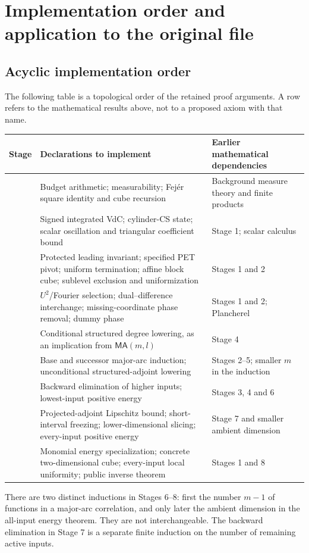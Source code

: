 \documentclass[11pt]{article}
\theoremstyle{definition}
\begin{document}
\section{Implementation order and application to the original file}
\label{patch:implementation}
\subsection{Acyclic implementation order}
The following table is a topological order of the retained proof arguments.  A row refers to
the mathematical results above, not to a proposed axiom with that name.
\begin{center}\small
\begin{tabular}{>{\raggedright\arraybackslash}p{.06\linewidth}>{\raggedright\arraybackslash}p{.47\linewidth}>{\raggedright\arraybackslash}p{.35\linewidth}}
\hline
Stage & Declarations to implement & Earlier mathematical dependencies \\\hline
1 & Budget arithmetic; measurability; Fej\'er square identity and cube recursion & Background measure theory and finite products \\
2 & Signed integrated VdC; cylinder-CS state; scalar oscillation and triangular coefficient bound & Stage 1; scalar calculus \\
3 & Protected leading invariant; specified PET pivot; uniform termination; affine block cube; sublevel exclusion and uniformization & Stages 1 and 2 \\
4 & $U^2$/Fourier selection; dual--difference interchange; missing-coordinate phase removal; dummy phase & Stages 1 and 2; Plancherel \\
5 & Conditional structured degree lowering, as an implication from $\mathsf{MA}(m,l)$ & Stage 4 \\
6 & Base and successor major-arc induction; unconditional structured-adjoint lowering & Stages 2--5; smaller $m$ in the induction \\
7 & Backward elimination of higher inputs; lowest-input positive energy & Stages 3, 4 and 6 \\
8 & Projected-adjoint Lipschitz bound; short-interval freezing; lower-dimensional slicing; every-input positive energy & Stage 7 and smaller ambient dimension \\
9 & Monomial energy specialization; concrete two-dimensional cube; every-input local uniformity; public inverse theorem & Stages 1 and 8 \\\hline
\end{tabular}
\end{center}
There are two distinct inductions in Stages 6--8: first the number $m-1$ of functions in a
major-arc correlation, and only later the ambient dimension in the all-input energy theorem.
They are not interchangeable.  The backward elimination in Stage 7 is a separate finite
induction on the number of remaining active inputs.
\end{document}
